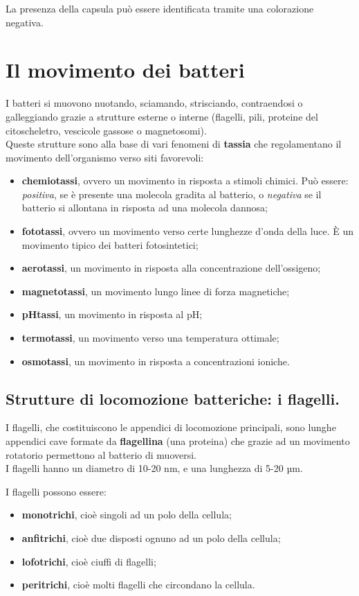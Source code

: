 \documentclass[11pt]{book}
\begin{document}
\vspace{1em}
La presenza della capsula può essere identificata tramite una colorazione negativa.

\chapter{Il movimento dei batteri}

I batteri si muovono nuotando, sciamando, strisciando, contraendosi o galleggiando grazie a strutture esterne o interne (flagelli, pili, proteine del citoscheletro, vescicole gassose o magnetosomi).\\
Queste strutture sono alla base di vari fenomeni di \textbf{tassia} che regolamentano il movimento dell'organismo verso siti favorevoli:
\begin{itemize}
\item \textbf{chemiotassi}, ovvero un movimento in risposta a stimoli chimici. Può essere: \emph{positiva}, se è presente una molecola gradita al batterio, o \emph{negativa} se il batterio si allontana in risposta ad una molecola dannosa;
\item \textbf{fototassi}, ovvero un movimento verso certe lunghezze d’onda della luce. È un movimento tipico dei batteri fotosintetici;
\item \textbf{aerotassi}, un movimento in risposta alla concentrazione dell’ossigeno;
\item \textbf{magnetotassi}, un movimento lungo linee di forza magnetiche;
\item \textbf{pHtassi}, un movimento in risposta al pH;
\item \textbf{termotassi}, un movimento verso una temperatura ottimale;
\item \textbf{osmotassi}, un movimento in risposta a concentrazioni ioniche.
\end{itemize}

\section{Strutture di locomozione batteriche: i flagelli.}

I flagelli, che costituiscono le appendici di locomozione principali, sono lunghe appendici cave formate da \textbf{flagellina} (una proteina) che grazie ad un movimento rotatorio permettono al batterio di muoversi.\\
I flagelli hanno un diametro di 10-20 nm, e una lunghezza di 5-20 µm.

\vspace{1em}
I flagelli possono essere:
\begin{itemize}
\item \textbf{monotrichi}, cioè singoli ad un polo della cellula; 
\item \textbf{anfitrichi}, cioè due disposti ognuno ad un polo della cellula; 
\item \textbf{lofotrichi}, cioè ciuffi di flagelli; 
\item \textbf{peritrichi}, cioè molti flagelli che circondano la cellula.
\end{itemize}
\end{document}
